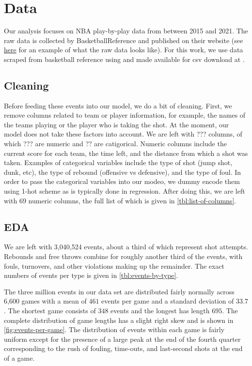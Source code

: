 \section{Data}

Our analysis focuses on NBA play-by-play data from between 2015 and 2021. The raw data is collected by BasketballReference and published on their website \cite{bbref} (see \href{https://www.basketball-reference.com/boxscores/pbp/202101200TOR.html#q1}{here} for an example of what the raw data looks like). For this work, we use data scraped from basketball reference using \cite{pbp-scraper-github} and made available for csv download at \cite{kaggle-pbp-data}.

\subsection{Cleaning}

Before feeding these events into our model, we do a bit of cleaning. First, we remove columns related to team or player information, for example, the names of the teams playing or the player who is taking the shot. At the moment, our model does not take these factors into account.
We are left with ??? columns, of which ??? are numeric and ?? are catigorical.
Numeric columns include the current score for each team, the time left, and the distance from which a shot was taken.
Examples of categorical variables include the type of shot (jump shot, dunk, etc), the type of rebound (offensive vs defensive), and the type of foul.
In order to pass the categorical variables into our modeo, we dummy encode them using 1-hot scheme as is typically done in regression. After doing this, we are left with 69 numeric columns, the full list of which is given in \autoref{tbl:list-of-columns}.

\subsection{EDA}

We are left with 3,040,524 events, about a third of which represent shot attempts. Rebounds and free throws combine for roughly another third of the events, with fouls, turnovers, and other violations making up the remainder. The exact numbers of events per type is given in \autoref{tbl:events-by-type}.

The three million events in our data set are distributed fairly normally across 6,600 games with a mean of $461$ events per game and a standard deviation of $33.7$. The shortest game consists of $348$ events and the longest has length $695$. The complete distribution of game lengths has a slight right skew and is shown in \autoref{fig:events-per-game}. The distribution of events within each game is fairly uniform except for the presence of a large peak at the end of the fourth quarter corresponding to the rush of fouling, time-outs, and last-second shots at the end of a game.

